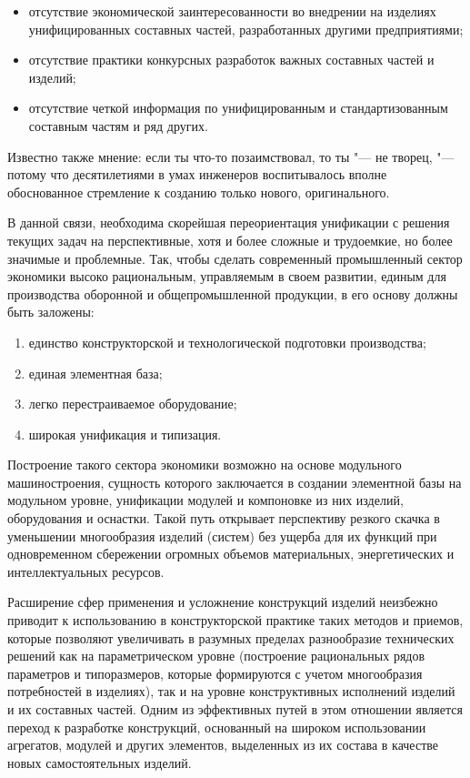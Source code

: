 \begin{itemize}
	\item отсутствие экономической заинтересованности во внедрении на изделиях унифицированных составных частей, разработанных другими предприятиями;
	\item отсутствие практики конкурсных разработок важных составных частей и изделий;
	\item отсутствие четкой информация по унифицированным и стандартизованным составным частям и ряд других.
\end{itemize}

Известно также мнение: если ты что-то позаимствовал, то ты "--- не творец, "--- потому что десятилетиями в умах инженеров воспитывалось вполне обоснованное стремление к созданию только нового, оригинального.

В данной связи, необходима скорейшая переориентация унификации с решения текущих задач на перспективные, хотя и более сложные и трудоемкие, но более значимые и проблемные. Так, чтобы сделать современный промышленный сектор экономики высоко рациональным, управляемым в своем развитии, единым для производства оборонной и общепромышленной продукции, в его основу должны быть заложены:

\begin{enumerate}
	\item единство конструкторской и технологической подготовки производства;
	\item единая элементная база;
	\item легко перестраиваемое оборудование;
	\item широкая унификация и типизация.
\end{enumerate}
 

Построение такого сектора экономики возможно на основе модульного машиностроения, сущность которого заключается в создании элементной базы на модульном уровне, унификации модулей и компоновке из них изделий, оборудования и оснастки. Такой путь открывает перспективу резкого скачка в уменьшении многообразия изделий (систем) без ущерба для их функций при одновременном сбережении огромных объемов материальных, энергетических и интеллектуальных ресурсов.

Расширение сфер применения и усложнение конструкций изделий неизбежно приводит к использованию в конструкторской практике таких методов и приемов, которые позволяют увеличивать в разумных пределах разнообразие технических решений как на параметрическом уровне (построение рациональных рядов параметров и типоразмеров, которые формируются с учетом многообразия потребностей в изделиях), так и на уровне конструктивных исполнений изделий и их составных частей. Одним из эффективных путей в этом отношении является переход к разработке конструкций, основанный на широком использовании агрегатов, модулей и других элементов, выделенных из их состава в качестве новых самостоятельных изделий.

